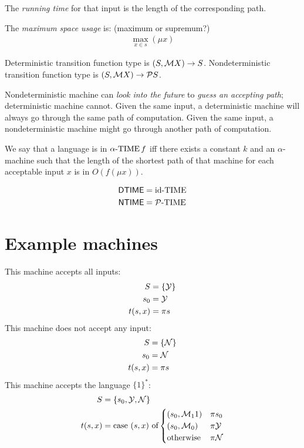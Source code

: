 The \emph{running time} for that input is the length of the corresponding path.

The \emph{maximum space usage} is: (maximum or supremum?)
\begin{align}
    \max_{x \in s} (\mu x)
\end{align}

Deterministic transition function type is $(S,\mathcal M X) \to S$.
Nondeterministic transition function type is $(S,\mathcal M X) \to \mathcal P S$.

Nondeterministic machine can \emph{look into the future}
to \emph{guess an accepting path};
deterministic machine cannot.
Given the same input, a deterministic machine
will always go through the same path of computation.
Given the same input, a nondeterministic machine
might go through another path of computation.


We say that a language is in $\operatorname{\alpha-TIME} f$ iff
there exists a constant $k$ and an $\alpha$-machine
such that the length of the shortest path of that machine
for each acceptable input $x$ is in $O(f(\mu x))$.

\begin{align}
    \operatorname{\mathsf{DTIME}} &= \operatorname{id-TIME}
 \\ \operatorname{\mathsf{NTIME}} &= \operatorname{\mathcal P-TIME}
\end{align}

\section{Example machines}

This machine accepts all inputs:
\begin{align*}
    S &= \{ \mathcal Y \}
    \\ s_0 &= \mathcal Y
 \\ t(s,x) &= \pi s
\end{align*}
This machine does not accept any input:
\begin{align*}
    S &= \{ \mathcal N \}
    \\ s_0 &= \mathcal N
 \\ t(s,x) &= \pi s
\end{align*}
This machine accepts the language $\{1\}^*$:
\begin{align*}
    S &= \{ s_0, \mathcal Y, \mathcal N \}
    \\ t(s,x) &= \text{case $(s,x)$ of} \begin{cases}
      (s_0, \mathcal M_1 1) &\pi s_0
        \\ (s_0, \mathcal M_0) &\pi \mathcal Y
 \\ \text{otherwise} &\pi \mathcal N
\end{cases}
\end{align*}

